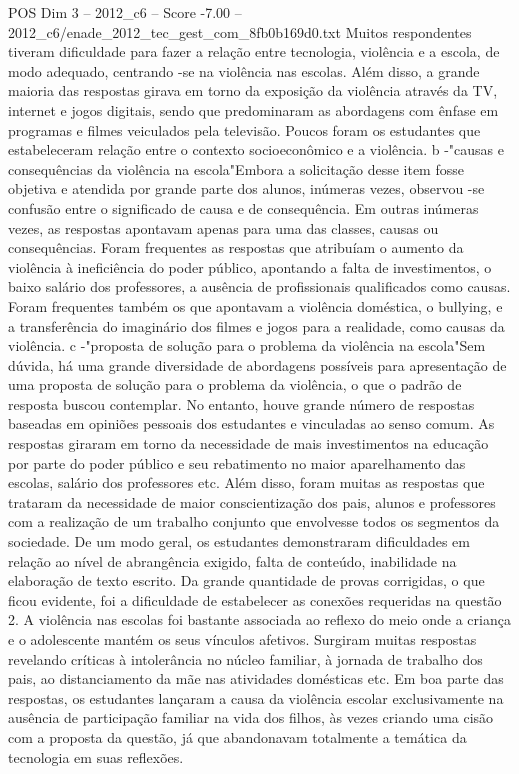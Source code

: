 \begin{textsample}{POS Dim 3 – 2012\_c6 – Score -7.00 – 2012\_c6/enade\_2012\_tec\_gest\_com\_8fb0b169d0.txt}
Muitos respondentes tiveram dificuldade para fazer a relação entre tecnologia, violência e a escola, de modo adequado, centrando -se na violência nas escolas.
Além disso, a grande maioria das respostas girava em torno da exposição da violência através da TV, internet e jogos digitais, sendo que predominaram as abordagens com ênfase em programas e filmes veiculados pela televisão.
Poucos foram os estudantes que estabeleceram relação entre o contexto socioeconômico e a violência. b -"causas e consequências da violência na escola"Embora a solicitação desse item fosse objetiva e atendida por grande parte dos alunos, inúmeras vezes, observou -se confusão entre o significado de causa e de consequência.
Em outras inúmeras vezes, as respostas apontavam apenas para uma das classes, causas ou consequências.
Foram frequentes as respostas que atribuíam o aumento da violência à ineficiência do poder público, apontando a falta de investimentos, o baixo salário dos professores, a ausência de profissionais qualificados como causas.
Foram frequentes também os que apontavam a violência doméstica, o bullying, e a transferência do imaginário dos filmes e jogos para a realidade, como causas da violência. c -"proposta de solução para o problema da violência na escola"Sem dúvida, há uma grande diversidade de abordagens possíveis para apresentação de uma proposta de solução para o problema da violência, o que o padrão de resposta buscou contemplar.
No entanto, houve grande número de respostas baseadas em opiniões pessoais dos estudantes e vinculadas ao senso comum.
As respostas giraram em torno da necessidade de mais investimentos na educação por parte do poder público e seu rebatimento no maior aparelhamento das escolas, salário dos professores etc.
Além disso, foram muitas as respostas que trataram da necessidade de maior conscientização dos pais, alunos e professores com a realização de um trabalho conjunto que envolvesse todos os segmentos da sociedade.
De um modo geral, os estudantes demonstraram dificuldades em relação ao nível de abrangência exigido, falta de conteúdo, inabilidade na elaboração de texto escrito.
Da grande quantidade de provas corrigidas, o que ficou evidente, foi a dificuldade de estabelecer as conexões requeridas na questão 2.
A violência nas escolas foi bastante associada ao reflexo do meio onde a criança e o adolescente mantém os seus vínculos afetivos.
Surgiram muitas respostas revelando críticas à intolerância no núcleo familiar, à jornada de trabalho dos pais, ao distanciamento da mãe nas atividades domésticas etc.
Em boa parte das respostas, os estudantes lançaram a causa da violência escolar exclusivamente na ausência de participação familiar na vida dos filhos, às vezes criando uma cisão com a proposta da questão, já que abandonavam totalmente a temática da tecnologia em suas reflexões.

\end{textsample}
